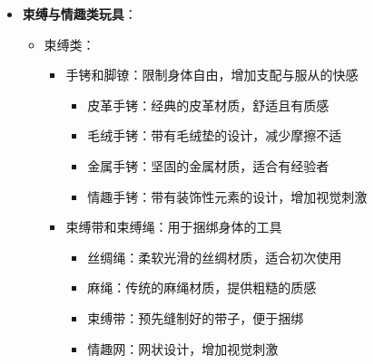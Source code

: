 \documentclass[12pt,UTF8]{ctexbook}
\begin{document}
\begin{itemize}
\begin{itemize}
\begin{itemize}
			\begin{itemize}
				\item 振动型：通过振动按摩乳房
				\item 吮吸型：模拟吮吸动作按摩乳房
				\item 加热型：带有加热功能的按摩器
			\end{itemize}
			\item 乳贴：贴在乳头上的刺激贴
			\begin{itemize}
				\item 震动乳贴：带有微型振动器的乳贴
				\item 电击乳贴：通过微弱电流提供刺激（需谨慎使用）
			\end{itemize}
		\end{itemize}
		\item 阴囊刺激器：专门刺激男性阴囊的玩具
		\begin{itemize}
			\item 阴囊夹：夹在阴囊上的刺激玩具
			\item 阴囊按摩器：按摩阴囊的振动玩具
			\item 阴囊拉伸器：用于拉伸阴囊的玩具（需谨慎使用）
		\end{itemize}
	\end{itemize}
	\item \textbf{束缚与情趣类玩具}：
	\begin{itemize}
		\item 束缚类：
		\begin{itemize}
			\item 手铐和脚镣：限制身体自由，增加支配与服从的快感
			\begin{itemize}
				\item 皮革手铐：经典的皮革材质，舒适且有质感
				\item 毛绒手铐：带有毛绒垫的设计，减少摩擦不适
				\item 金属手铐：坚固的金属材质，适合有经验者
				\item 情趣手铐：带有装饰性元素的设计，增加视觉刺激
			\end{itemize}
			\item 束缚带和束缚绳：用于捆绑身体的工具
			\begin{itemize}
				\item 丝绸绳：柔软光滑的丝绸材质，适合初次使用
				\item 麻绳：传统的麻绳材质，提供粗糙的质感
				\item 束缚带：预先缝制好的带子，便于捆绑
				\item 情趣网：网状设计，增加视觉刺激
			\end{itemize}

\end{itemize}
\end{itemize}
\end{itemize}
\end{document}
